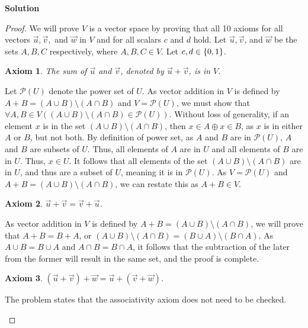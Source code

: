 \documentclass[11pt]{scrartcl}
\theoremstyle{dotlessP}
\newtheorem{axiom}{Axiom}
\theoremstyle{dotlessN}
\DeclarePairedDelimiter\set{\{}{\}}
\newcommand{\unite}{\cup}
\newcommand{\inter}{\cap}
\newcommand{\xor}{\oplus}
\newcommand{\powset}{\mathcal{P}}
\begin{document}
\textbf{Solution}
\begin{proof}
	We will prove $V$ is a vector space by proving that all 10 axioms for all vectors $\vec{u}, \vec{v},$ and $\vec{w}$ in $V$ and for all scalars $c$ and $d$ hold. Let $\vec{u}, \vec{v}$, and $\vec{w}$ be  the sets $A,B,C$ respectively, where $A,B,C \in V$. Let $c,d \in \set*{0,1}$.
		\begin{axiom}
			The sum of $\vec{u}$ and $\vec{v}$, denoted by $\vec{u} + \vec{v}$, is in $V$.
		\end{axiom}
		\begin{subproof}
			[Subproof]
			Let $\powset(U)$ denote the power set of $U$. As vector addition in  $V$ is defined by $A + B = (A \unite B) \setminus (A \inter B)$ and $V = \mathcal{P}(U)$, we must show that $\forall A, B \in V ((A \unite B) \setminus (A \inter B) \in \mathcal{P}(U))$. Without loss of generality, if an element $x$ is in the set $(A \unite B) \setminus (A \inter B)$, then $x \in A \xor x \in B$, as $x$ is in either $A$ or $B$, but not both. By definition of power set, as $A$ and $B$ are in $\powset(U)$, $A$ and $B$ are subsets of $U$. Thus, all elements of $A$ are in $U$ and all elements of $B$ are in $U$. Thus, $x \in U$. It follows that all elements of the set $(A \unite B) \setminus (A \inter B)$ are in $U$, and thus are a subset of $U$, meaning it is in $\powset(U)$. As $V = \powset(U)$ and $A + B = (A \unite B) \setminus (A \inter B)$,  we can restate this as $A + B \in V$.
		\end{subproof}
		\begin{axiom}
			$\vec{u} + \vec{v} = \vec{v} + \vec{u}$.
			\label{axiom:2}
		\end{axiom}
		\begin{subproof}
			[Subproof]
			As vector addition in $V$ is defined by $A + B = (A \unite B) \setminus (A \inter B)$, we will prove that $A + B = B + A$, or $(A \unite B) \setminus (A \inter B) = (B \unite A) \setminus (B \inter A)$. As $A \unite B = B \unite A$ and $A \inter B = B \inter A$, it follows that the subtraction of the later from the former will result in the same set, and the proof is complete.
		\end{subproof}
		\begin{axiom}
			$(\vec{u} + \vec{v}) + \vec{w} = \vec{u} + (\vec{v} + \vec{w})$.
		\end{axiom}
		\begin{subproof}
			[Subproof]
			The problem states that the associativity axiom does not need to be checked.
		\end{subproof}

\end{proof}
\end{document}
